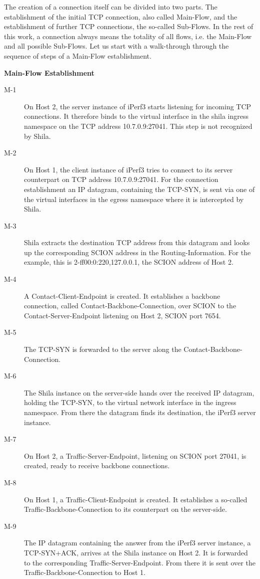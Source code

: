 The creation of a connection itself can be divided into two parts. The establishment of the initial TCP connection, also called Main-Flow, and the establishment of further TCP connections, the so-called Sub-Flows. In the rest of this work, a connection always means the totality of all flows, i.e. the Main-Flow and all possible Sub-Flows. Let us start with a walk-through through the sequence of steps of a Main-Flow establishment.

\textbf{Main-Flow Establishment}

\begin{description}
	\item[M-1] On Host 2, the server instance of iPerf3 starts listening for incoming TCP connections. It therefore binds to the virtual interface in the shila ingress namespace on the TCP address 10.7.0.9:27041. This step is not recognized by Shila.
	\item[M-2] On Host 1, the client instance of iPerf3 tries to connect to its server counterpart on TCP address 10.7.0.9:27041. For the connection establishment an IP datagram, containing the TCP-SYN, is sent via one of the virtual interfaces in the egress namespace where it is intercepted by Shila.
	\item[M-3] Shila extracts the destination TCP address from this datagram and looks up the corresponding SCION address in the Routing-Information. For the example, this is 2-ff00:0:220,127.0.0.1, the SCION address of Host 2. 
	\item[M-4] A Contact-Client-Endpoint is created. It establishes a backbone connection, called Contact-Backbone-Connection, over SCION to the Contact-Server-Endpoint listening on Host 2, SCION port 7654.
	\item[M-5] The TCP-SYN is forwarded to the server along the Contact-Backbone-Connection.
	\item[M-6] The Shila instance on the server-side hands over the received IP datagram, holding the TCP-SYN, to the virtual network interface in the ingress namespace. From there the datagram finds its destination, the iPerf3 server instance.
	\item[M-7] On Host 2, a Traffic-Server-Endpoint, listening on SCION port 27041, is created, ready to receive backbone connections.
	\item[M-8] On Host 1, a Traffic-Client-Endpoint is created. It establishes a so-called Traffic-Backbone-Connection to its counterpart on the server-side.
	\item[M-9] The IP datagram containing the answer from the iPerf3 server instance, a TCP-SYN+ACK, arrives at the Shila instance on Host 2. It is forwarded to the corresponding Traffic-Server-Endpoint. From there it is sent over the Traffic-Backbone-Connection to Host 1.

\end{description}
